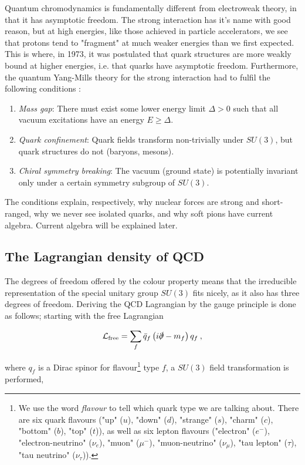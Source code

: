 \documentclass[10pt,twoside]{report}
\begin{document}
	Quantum chromodynamics is fundamentally different from electroweak theory, in that it has asymptotic freedom. The strong interaction has it's name with good reason, but at high energies, like those achieved in particle accelerators, we see that protons tend to "fragment" at much weaker energies than we first expected. This is where, in 1973, it was postulated that quark structures are more weakly bound at higher energies, i.e. that quarks have asymptotic freedom. Furthermore, the quantum Yang-Mills theory for the strong interaction had to fulfil the following conditions \cite{JaffeWitten}:
	
	\begin{enumerate}
		\item \emph{Mass gap}: There must exist some lower energy limit $\Delta > 0$ such that all vacuum excitations have an energy $E\geq \Delta$.
		\item \emph{Quark confinement}: Quark fields transform non-trivially under $SU(3)$, but quark structures do not (baryons, mesons).
		\item \emph{Chiral symmetry breaking}: The vacuum (ground state) is potentially invariant only under a certain symmetry subgroup of $SU(3)$.
	\end{enumerate}
	
	The conditions explain, respectively, why nuclear forces are strong and short-ranged, why we never see isolated quarks, and why soft pions have current algebra. Current algebra will be explained later.
	
	\subsection{The Lagrangian density of QCD}
	The degrees of freedom offered by the colour property means that the irreducible representation of the special unitary group $SU(3)$ fits nicely, as it also has three degrees of freedom. Deriving the QCD Lagrangian by the gauge principle is done as follows; starting with the free Lagrangian
	
	\begin{equation}
	\mathcal{L}_{\text{free}} = \sum_f \bar{q}_f\left(i\slashed \partial - m_f\right)q_f \:,
	\end{equation}
	
	\noindent where $q_f$ is a Dirac spinor for flavour\footnote{We use the word \emph{flavour} to tell which quark type we are talking about. There are six quark flavours ("up" ($u$), "down" ($d$), "strange" ($s$), "charm" ($c$), "bottom" ($b$), "top" ($t$)), as well as six lepton flavours ("electron" ($e^-$), "electron-neutrino" ($\nu_e$), "muon" ($\mu^-$), "muon-neutrino" ($\nu_\mu$), "tau lepton" ($\tau$), "tau neutrino" ($\nu_\tau$)).} type $f$, a $SU(3)$ field transformation is performed,
	
\end{document}
